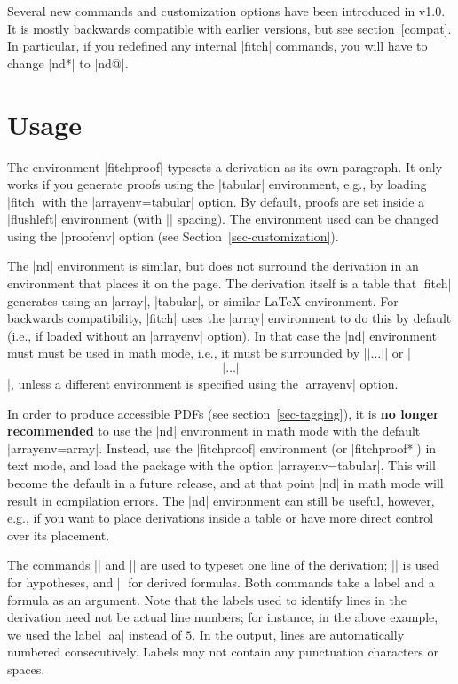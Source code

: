 \documentclass{ltxdoc}
\newcommand\NewIn[1]{\leavevmode
  \marginpar{\hfill\fbox{\fbox{New in #1}}\hspace*{1em}}\ignorespaces}
\begin{document}
\NewIn{1.0} Several new commands and customization options have been
introduced in v1.0. It is mostly backwards compatible with earlier
versions, but see section~\ref{compat}. In particular, if you
redefined any internal |fitch| commands, you will have to change |nd*|
to |nd@|.

\section{Usage}\label{sec-usage}

 The environment |fitchproof|
typesets a derivation as its own paragraph. It only works if you
generate proofs using the |tabular| environment, e.g., by loading
|fitch| with the |arrayenv=tabular| option. By default, proofs are set
inside a |flushleft| environment (with |\topsep| spacing). The
environment used can be changed using the |proofenv| option (see
Section~\ref{sec-customization}).

The |nd| environment is similar, but does not surround the derivation
in an environment that places it on the page. The derivation itself is
a table that |fitch| generates using an |array|, |tabular|, or similar
\LaTeX{} environment. For backwards compatibility, |fitch| uses the
|array| environment to do this by default (i.e., if loaded without an
|arrayenv| option). In that case the |nd| environment must must be
used in math mode, i.e., it must be surrounded by |$|\dots|$| or
|\[|\dots|\]|, unless a different environment is specified using the
|arrayenv| option.

\NewIn{1.1} In order to produce accessible PDFs (see
section~\ref{sec-tagging}), it is \textbf{no longer recommended} to
use the |nd| environment in math mode with the default
|arrayenv=array|. Instead, use the |fitchproof| environment (or
|fitchproof*|) in text mode, and load the package with the option
|arrayenv=tabular|. This will become the default in a future release,
and at that point |nd| in math mode will result in compilation errors.
The |nd| environment can still be useful, however, e.g., if you want
to place derivations inside a table or have more direct control over
its placement.

\DescribeMacro{\hypo}\DescribeMacro{\have}
The commands |\hypo| and |\have| are used
to typeset one line of the derivation; |\hypo| is used for
hypotheses, and |\have| for derived formulas. Both commands take
a label and a formula as an argument. Note that the labels used to
identify lines in the derivation need not be actual line numbers; for
instance, in the above example, we used the label |aa| instead of $5$.
In the output, lines are automatically numbered consecutively. Labels
may not contain any punctuation characters or spaces.
\end{document}
